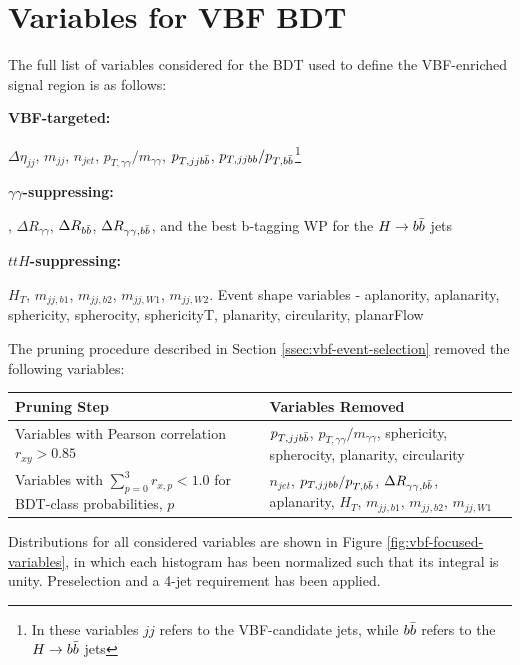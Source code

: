 \chapter{Variables for VBF BDT} \label{app:vbf-variables}

The full list of variables considered for the BDT used to define the VBF-enriched signal region is as follows:

\textbf{VBF-targeted:}

$\Delta \eta_{jj}$, $m_{jj}$, $n_{jet}$, $p_{T, \gamma\gamma}/m_{\gamma\gamma}$, $p_{T,jjb\bar{b}}$, $p_{T,jjbb}/p_{T,b\bar{b}}$\footnote{In these variables $jj$ refers to the VBF-candidate jets, while $b\bar{b}$ refers to the $H\rightarrow b\bar{b}$ jets}

\textbf{$\gamma \gamma$-suppressing:}

\myybb, $\Delta R_{\gamma\gamma}$, $\Delta R_{b\bar{b}}$, $\Delta R_{\gamma \gamma,b\bar{b}}$, and the best b-tagging WP for the $H\rightarrow b\bar{b}$ jets

\textbf{$ttH$-suppressing:}

$H_{T}$, $m_{jj,b1}$, $m_{jj,b2}$, $m_{jj,W1}$, $m_{jj,W2}$. Event shape variables \cite{STDM-2011-33} - aplanority, aplanarity, sphericity, spherocity, sphericityT, planarity, circularity, planarFlow

The pruning procedure described in Section \ref{ssec:vbf-event-selection} removed the following variables:

\begin{center}
  \begin{table}[h]
	  \begin{tabularx}{\textwidth}{Y|Y}
	    \hline
	    Pruning Step & Variables Removed  \\
	    \hline
      Variables with Pearson correlation $r_{xy} > 0.85$  &  $p_{T,jjb\bar{b}}$, $p_{T, \gamma\gamma}/m_{\gamma\gamma}$, sphericity, spherocity, planarity, circularity \\
      \hline
	    Variables with $\sum\limits_{p=0}^{3} r_{x,p} < 1.0$ for BDT-class probabilities, $p$ &  $n_{jet}$, $p_{T,jjbb}/p_{T,b\bar{b}}$, $\Delta R_{\gamma \gamma,b\bar{b}}$, aplanarity, $H_{T}$, $m_{jj,b1}$, $m_{jj,b2}$, $m_{jj,W1}$ \\
	    \hline
    \end{tabularx}
  \end{table}
\end{center}



Distributions for all considered variables are shown in Figure \ref{fig:vbf-focused-variables}, in which each histogram has been normalized such that its integral is unity. Preselection and a 4-jet requirement has been applied.


